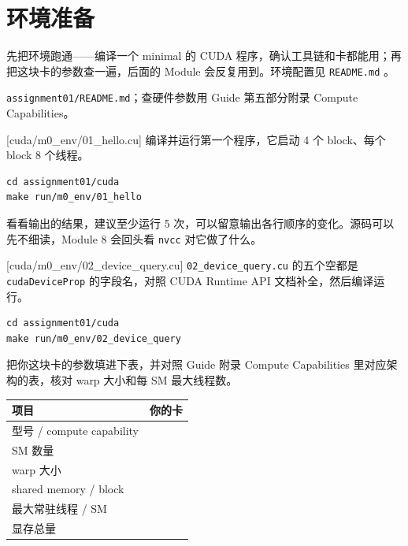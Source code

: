 \documentclass[11pt,a4paper,fontset=none]{ctexart}
\begin{document}
\setcounter{section}{-1}

\section{环境准备}

先把环境跑通——编译一个 minimal 的 CUDA 程序，确认工具链和卡都能用；再把这块卡的参数查一遍，后面的 Module 会反复用到。环境配置见 \texttt{README.md} 。

\begin{reading}
\texttt{assignment01/README.md}；查硬件参数用 Guide 第五部分附录 Compute Capabilities。
\end{reading}

[cuda/m0\_env/01\_hello.cu]
编译并运行第一个程序，它启动 4 个 block、每个 block 8 个线程。

\begin{lstlisting}
cd assignment01/cuda
make run/m0_env/01_hello
\end{lstlisting}

看看输出的结果，建议至少运行 5 次，可以留意输出各行顺序的变化。源码可以先不细读，Module 8 会回头看 \texttt{nvcc} 对它做了什么。

[cuda/m0\_env/02\_device\_query.cu]
\texttt{02\_device\_query.cu} 的五个空都是 \texttt{cudaDeviceProp} 的字段名，对照 CUDA Runtime API 文档补全，然后编译运行。

\begin{lstlisting}
cd assignment01/cuda
make run/m0_env/02_device_query
\end{lstlisting}

把你这块卡的参数填进下表，并对照 Guide 附录 Compute Capabilities 里对应架构的表，核对 warp 大小和每 SM 最大线程数。

\begin{center}\small
\begin{tabular}{@{}ll@{}}
\toprule
项目 & 你的卡 \\
\midrule
型号 / compute capability & \\
SM 数量 & \\
warp 大小 & \\
shared memory / block & \\
最大常驻线程 / SM & \\
显存总量 & \\
\bottomrule
\end{tabular}
\end{center}
\end{document}
